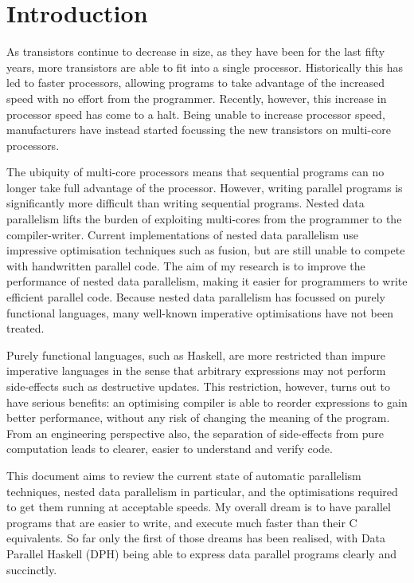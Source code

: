 
\section{Introduction}
As transistors continue to decrease in size, as they have been for the last fifty years, more transistors are able to fit into a single processor.
Historically this has led to faster processors, allowing programs to take advantage of the increased speed with no effort from the programmer.
Recently, however, this increase in processor speed has come to a halt.
Being unable to increase processor speed, manufacturers have instead started focussing the new transistors on multi-core processors.

The ubiquity of multi-core processors means that sequential programs can no longer take full advantage of the processor.
However, writing parallel programs is significantly more difficult than writing sequential programs.
Nested data parallelism lifts the burden of exploiting multi-cores from the programmer to the compiler-writer.
Current implementations of nested data parallelism use impressive optimisation techniques such as fusion, but are still unable to compete with handwritten parallel code.
The aim of my research is to improve the performance of nested data parallelism, making it easier for programmers to write efficient parallel code.
Because nested data parallelism has focussed on purely functional languages, many well-known imperative optimisations have not been treated.

Purely functional languages, such as Haskell, are more restricted than impure imperative languages
in the sense that arbitrary expressions may not perform side-effects such as destructive updates.
This restriction, however, turns out to have serious benefits:
an optimising compiler is able to reorder expressions to gain better performance,
without any risk of changing the meaning of the program.
From an engineering perspective also, the separation of side-effects from pure computation leads to clearer, easier to understand and verify code.

This document aims to review the current state of automatic parallelism techniques, nested data parallelism in particular,
and the optimisations required to get them running at acceptable speeds.
My overall dream is to have parallel programs that are easier to write, and execute much faster than their C equivalents.
So far only the first of those dreams has been realised, with Data Parallel Haskell (DPH)
being able to express data parallel programs clearly and succinctly.
